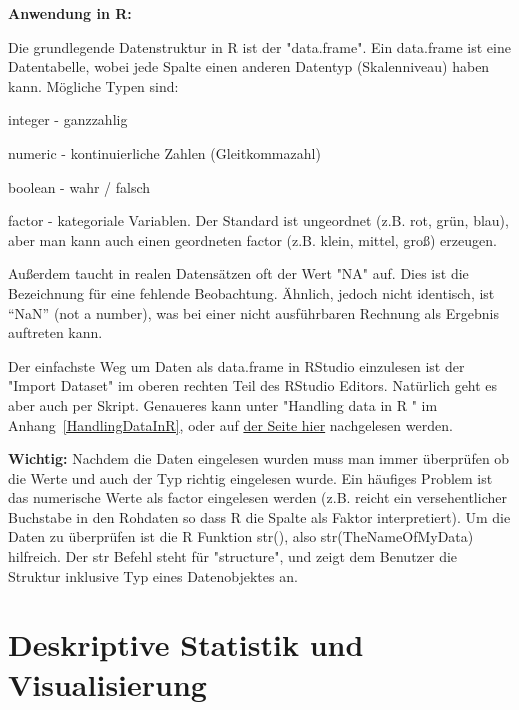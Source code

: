 \documentclass[a4paper,twoside]{tufte-book}\usepackage[]{graphicx}\usepackage[]{color}
\begin{document}
	
	\vspace{1cm}
	\begin{fullwidth}
		\begin{mdframed}
			
			\textbf{Anwendung in R:} 
			
			Die grundlegende Datenstruktur in R ist der "data.frame". Ein data.frame ist eine Datentabelle, wobei jede Spalte einen anderen Datentyp (Skalenniveau) haben kann. Mögliche Typen sind:
			
			\begin{itemize*}
				\item integer - ganzzahlig
				\item numeric - kontinuierliche Zahlen (Gleitkommazahl)
				\item boolean - wahr / falsch
				\item factor - kategoriale Variablen. Der Standard ist ungeordnet (z.B. rot, grün, blau), aber man kann auch einen geordneten factor (z.B. klein, mittel, groß) erzeugen.
			\end{itemize*}
			
			Außerdem taucht in realen Datensätzen oft der Wert "NA" auf. Dies ist die Bezeichnung für eine fehlende Beobachtung. Ähnlich, jedoch nicht identisch, ist "`NaN"' (not a number), was bei einer nicht ausführbaren Rechnung als Ergebnis auftreten kann.
			
			Der einfachste Weg um Daten als data.frame in RStudio einzulesen ist der "Import Dataset" im oberen rechten Teil des RStudio Editors. Natürlich geht es aber auch per Skript. Genaueres kann unter "Handling data in R " im Anhang~\ref{HandlingDataInR}, oder auf \href{http://biometry.github.io/APES/R/R20-DataStructures.html}{der Seite hier} nachgelesen werden.
			
			\textbf{Wichtig:} Nachdem die Daten eingelesen wurden muss man immer überprüfen ob die Werte und auch der Typ richtig eingelesen wurde. Ein häufiges Problem ist das numerische Werte als factor eingelesen werden (z.B. reicht ein versehentlicher Buchstabe in den Rohdaten so dass R die Spalte als Faktor interpretiert). Um die Daten zu überprüfen ist die R Funktion str(), also str(TheNameOfMyData) hilfreich. Der str Befehl steht für "structure", und zeigt dem Benutzer die Struktur inklusive Typ eines Datenobjektes an. 			
		\end{mdframed}
	\end{fullwidth}
	
	
	\chapter{Deskriptive Statistik und Visualisierung}\label{ch: deskriptive Statistik}
	
\end{document}
